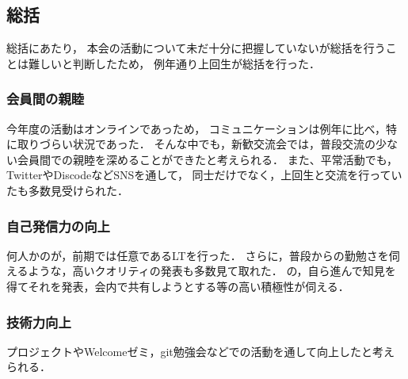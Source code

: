 \subsection*{\firstGrade{}総括}



\firstGrade{}総括にあたり，
本会の活動について未だ十分に把握していない\firstGrade{}が総括を行うことは難しいと判断したため，
例年通り上回生が総括を行った．


\subsubsection{会員間の親睦}
今年度の活動はオンラインであっため，
コミュニケーションは例年に比べ，特に取りづらい状況であった．
そんな中でも，新歓交流会では，普段交流の少ない会員間での親睦を深めることができたと考えられる．
また、平常活動でも，TwitterやDiscodeなどSNSを通して，
\firstGrade{}同士だけでなく，上回生と交流を行っていた\firstGrade{}も多数見受けられた．


\subsubsection{自己発信力の向上}
何人かの\firstGrade{}が，前期では任意であるLTを行った．
さらに，普段からの勤勉さを伺えるような，高いクオリティの発表も多数見て取れた．
\firstGrade{}の，自ら進んで知見を得てそれを発表，会内で共有しようとする等の高い積極性が伺える．


\subsubsection{技術力向上}
プロジェクトやWelcomeゼミ，git勉強会などでの活動を通して向上したと考えられる．
